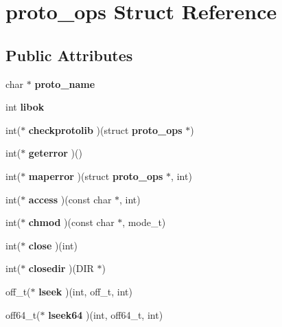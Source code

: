 \section{proto\_\-ops Struct Reference}
\label{structproto__ops}
\subsection*{Public Attributes}
\begin{DoxyCompactItemize}
\item 
char $\ast$ {\bfseries proto\_\-name}\label{structproto__ops_a8e2056a9bd92575ee0b68050a0d10e24}

\item 
int {\bfseries libok}\label{structproto__ops_a1ae780601c953542045e2bd13776c14c}

\item 
int($\ast$ {\bfseries checkprotolib} )(struct {\bf proto\_\-ops} $\ast$)\label{structproto__ops_a44196fdc5e2736d6841375cacc665bb7}

\item 
int($\ast$ {\bfseries geterror} )()\label{structproto__ops_a08405b621cec39a178cef6e9cdde1b81}

\item 
int($\ast$ {\bfseries maperror} )(struct {\bf proto\_\-ops} $\ast$, int)\label{structproto__ops_aacfc016f0b4d19897b116bcf8498b5af}

\item 
int($\ast$ {\bfseries access} )(const char $\ast$, int)\label{structproto__ops_a60f33ee9eefb27740f868a819781bf0d}

\item 
int($\ast$ {\bfseries chmod} )(const char $\ast$, mode\_\-t)\label{structproto__ops_a432c1edc7f4bf9655f4db708a5f07e89}

\item 
int($\ast$ {\bfseries close} )(int)\label{structproto__ops_a7636403e8c2fbe9afba95cb109a943a8}

\item 
int($\ast$ {\bfseries closedir} )(DIR $\ast$)\label{structproto__ops_ae5c0b2cc0d831e9f7a22536490a40349}

\item 
off\_\-t($\ast$ {\bfseries lseek} )(int, off\_\-t, int)\label{structproto__ops_a85723d5172f7478428d06020af54fb11}

\item 
off64\_\-t($\ast$ {\bfseries lseek64} )(int, off64\_\-t, int)\label{structproto__ops_a789171e396b6804638a42f865384297f}


\end{DoxyCompactItemize}

